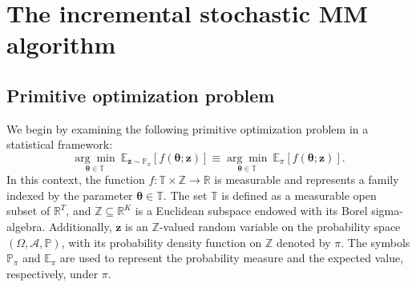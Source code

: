 \documentclass{article}
\newcommand{\Ebd}[2]{\mathbb{E}_{#1} \left[#2\right]}
\def\rset{\mathbb{R}}
\def\PP{\mathbb{P}_\pi} %
\def\PE{\mathbb{E}_\pi} %
\def\rvz{{\mathbf{z}}}
\def\vtheta{{\bm{\theta}}}
\def\sP{{\mathbb{P}}}
\def\sT{{\mathbb{T}}}
\def\sZ{{\mathbb{Z}}}
\newcommand{\E}{\mathbb{E}}
\begin{document}
\section{The incremental stochastic MM algorithm}\label{sec_online_MM_problem}

\subsection{Primitive optimization problem}\label{sec_original_optimization}

We begin by examining the following primitive optimization problem in a statistical framework:
\begin{equation}
\underset{\vtheta \in \sT}{\arg\min}~ \Ebd{\rvz \sim \PP}{f\left(\vtheta; \rvz \right)} 
\equiv\underset{\vtheta \in \sT}{\arg\min}~ \PE\left[f\left(\vtheta; \rvz \right)\right].\label{eq_main_problem}
\end{equation}
In this context, the function $f: \sT \times \sZ \rightarrow \rset$ is measurable and represents a family indexed by the parameter $\vtheta \in \sT$. The set $\sT$ is defined as a measurable open subset of $\rset^T$, and $\sZ \subseteq \rset^K$ is a Euclidean subspace endowed with its Borel sigma-algebra. Additionally, $\rvz$ is an $\sZ$-valued random variable on the probability space $(\Omega, \mathcal{A}, \sP)$, with its probability density function on $\sZ$ denoted by $\pi$. The symbols $\PP$ and $\E_\pi$ are used to represent the probability measure and the expected value, respectively, under $\pi$.
\end{document}
